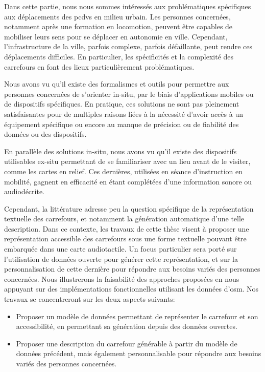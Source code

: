 
Dans cette partie, nous nous sommes intéressés aux problématiques spécifiques aux déplacements des \glspl{pcdv} en milieu urbain. Les personnes concernées, notamment après une formation en locomotion, peuvent être capables de mobiliser leurs sens pour se déplacer en autonomie en ville. Cependant, l'infrastructure de la ville, parfois complexe, parfois défaillante, peut rendre ces déplacements difficiles. En particulier, les spécificités et la complexité des carrefours en font des lieux particulièrement problématiques.

\newpar{}

Nous avons vu qu'il existe des formalismes et outils pour permettre aux personnes concernées de s'orienter in-situ, par le biais d'applications mobiles ou de dispositifs spécifiques. En pratique, ces solutions ne sont pas pleinement satisfaisantes pour de multiples raisons liées à la nécessité d'avoir accès à un équipement spécifique ou encore au manque de précision ou de fiabilité des données ou des dispositifs.

\newpar{}

En parallèle des solutions in-situ, nous avons vu qu'il existe des dispositifs utilisables ex-situ permettant de se familiariser avec un lieu avant de le visiter, comme les cartes en relief. Ces dernières, utilisées en séance d'instruction en mobilité, gagnent en efficacité en étant complétées d'une information sonore ou audiodécrite.

\newpar{}

Cependant, la littérature adresse peu la question spécifique de la représentation textuelle des carrefours, et notamment la génération automatique d'une telle description. Dans ce contexte, les travaux de cette thèse visent à proposer une représentation accessible des carrefours sous une forme textuelle pouvant être embarquée dans une carte audiotactile. Un focus particulier sera porté sur l'utilisation de données ouverte pour générer cette représentation, et sur la personnalisation de cette dernière pour répondre aux besoins variés des personnes concernées. Nous illustrerons la faisabilité des approches proposées en nous appuyant sur des implémentations fonctionnelles utilisant les données d'\gls{osm}. Nos travaux se concentreront sur les deux aspects suivants:

\begin{itemize}
    \item Proposer un modèle de données permettant de représenter le carrefour et son accessibilité, en permettant sa génération depuis des données ouvertes.
    \item Proposer une description du carrefour générable à partir du modèle de données précédent, mais également personnalisable pour répondre aux besoins variés des personnes concernées.
\end{itemize}